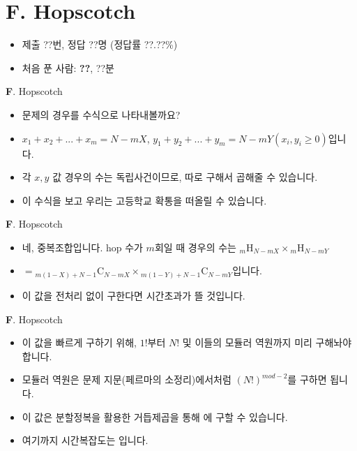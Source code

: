 \section{F. Hopscotch}

\begin{frame} %
    \begin{itemize}
        \item 제출 ??번, 정답 ??명 (정답률 ??.??\%)
        \item 처음 푼 사람: \textbf{??}, ??분
    \end{itemize}
\end{frame}

\begin{frame}{\textbf{F}. Hopscotch}
    \begin{itemize}
        \item 문제의 경우를 수식으로 나타내볼까요?
        \item $x_{1}+x_{2}+...+x_{m}=N-mX$, $y_{1}+y_{2}+...+y_{m}=N-mY (x_{i}, y_{i} \geq 0)$입니다.
        \item 각 $x, y$ 값 경우의 수는 독립사건이므로, 따로 구해서 곱해줄 수 있습니다.
        \item 이 수식을 보고 우리는 고등학교 확통을 떠올릴 수 있습니다.
    \end{itemize}
\end{frame}

\begin{frame}{\textbf{F}. Hopscotch}
    \begin{itemize}
        \item 네, 중복조합입니다. hop 수가 $m$회일 때 경우의 수는 ${}_m \mathrm{H}_{N-mX} \times {}_m \mathrm{H}_{N-mY}$
        \item $= {}_{m(1-X)+N-1} \mathrm{C}_{N-mX} \times {}_{m(1-Y)+N-1} \mathrm{C}_{N-mY}$입니다.
        \item 이 값을 전처리 없이 구한다면 시간초과가 뜰 것입니다.
    \end{itemize}
\end{frame}

\begin{frame}{\textbf{F}. Hopscotch}
    \begin{itemize}
        \item 이 값을 빠르게 구하기 위해, $1!$부터 $N!$ 및 이들의 모듈러 역원까지 미리 구해놔야 합니다.
        \item 모듈러 역원은 문제 지문(페르마의 소정리)에서처럼 $(N!)^{mod-2}$를 구하면 됩니다.
        \item 이 값은 분할정복을 활용한 거듭제곱을 통해  에 구할 수 있습니다.
        \item 여기까지 시간복잡도는 입니다.
    \end{itemize}
\end{frame}

